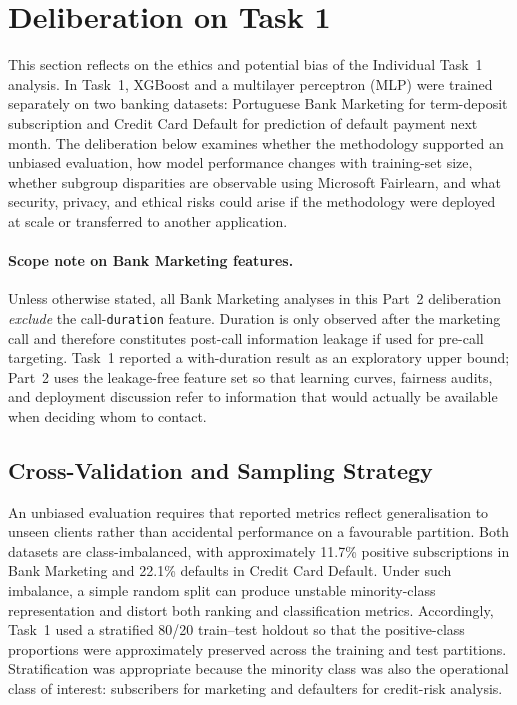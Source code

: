 
\section{Deliberation on Task 1}
\label{sec:part2-deliberation}

This section reflects on the ethics and potential bias of the Individual Task~1
analysis. In Task~1, XGBoost and a multilayer perceptron (MLP) were trained separately
on two banking datasets: Portuguese Bank Marketing for term-deposit subscription and
Credit Card Default for prediction of default payment next month. The deliberation
below examines whether the methodology supported an unbiased evaluation, how model
performance changes with training-set size, whether subgroup disparities are
observable using Microsoft Fairlearn, and what security, privacy, and ethical risks
could arise if the methodology were deployed at scale or transferred to another
application.

\paragraph{Scope note on Bank Marketing features.}
Unless otherwise stated, all Bank Marketing analyses in this Part~2 deliberation
\emph{exclude} the call-\texttt{duration} feature. Duration is only observed after the
marketing call and therefore constitutes post-call information leakage if used for
pre-call targeting. Task~1 reported a with-duration result as an exploratory upper
bound; Part~2 uses the leakage-free feature set so that learning curves, fairness
audits, and deployment discussion refer to information that would actually be
available when deciding whom to contact.

\subsection{Cross-Validation and Sampling Strategy}
\label{sec:part2-cv}

An unbiased evaluation requires that reported metrics reflect generalisation to
unseen clients rather than accidental performance on a favourable partition. Both
datasets are class-imbalanced, with approximately 11.7\% positive subscriptions in
Bank Marketing and 22.1\% defaults in Credit Card Default. Under such imbalance, a
simple random split can produce unstable minority-class representation and distort
both ranking and classification metrics. Accordingly, Task~1 used a stratified 80/20
train--test holdout so that the positive-class proportions were approximately
preserved across the training and test partitions. Stratification was appropriate
because the minority class was also the operational class of interest: subscribers
for marketing and defaulters for credit-risk analysis.


